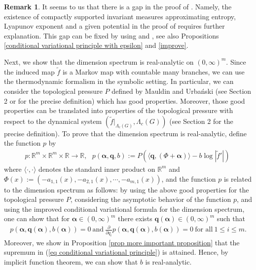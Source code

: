 \documentclass{article}
\theoremstyle{definition}
\newtheorem{rem}[thm]{Remark}
\begin{document}
\begin{rem} \label{remark-gap}
   It seems to us that there is a gap in the proof of \cite[Lemma 3.2]{iommi2015multifractal}. Namely, the existence of compactly supported invariant measures approximating  entropy, Lyapunov exponent and a given potential in the proof of \cite[Lemma 3.2]{iommi2015multifractal} requires further explanation. This gap can be fixed by  using \cite[Lemma 2.3]{jaerisch2021mixed} and \cite[Main theorem]{takahasi2020entropy}, see also Propositions \ref{conditional variational principle with epsilon} and \ref{improve}.  
\end{rem}
Next, we show that the dimension spectrum is real-analytic on $(0,\infty)^m$. Since the induced map $\tilde f$ is a Markov map with countable many branches, we can use the thermodynamic formalism in the symbolic setting. In particular, we can consider the topological pressure $P$ defined by Mauldin and Urba\'nski (see Section 2 or \cite{mauldin2003graph} for the precise definition) which has good properties. Moreover, those good properties can be translated into properties of the topological pressure with respect to the dynamical system $(\tilde f|_{\Lambda_c(G)},\Lambda_c(G))$ (see Section 2 for the precise definition).
To prove that the dimension spectrum is real-analytic, define the function $p$ by 
\begin{align*}
 p:\mathbb{R}^m\times\mathbb{R}^m\times\mathbb{R}\rightarrow \mathbb{R},\ \ \    
p(\boldsymbol{\alpha},\boldsymbol{q},b):=P(\langle\boldsymbol{q},(\Phi+\boldsymbol{\alpha})\rangle-b\log|\tilde f'|)\  
\end{align*} 
where $\langle\cdot ,\cdot \rangle$ denotes the standard inner product on $\mathbb{R}^m$ and $\Phi(x):=(-a_{1,1}(x),-a_{2,1}(x),\cdots,-a_{m,1}(x)) \nonumber$, and the function $p$ is related to the dimension spectrum as follows:
by using the above good properties for the topological pressure $P$, considering the asymptotic behavior of the function $p$, and using the improved conditional  variational formula for the dimension spectrum, 
 one can show that for $\boldsymbol{\alpha}\in(0,\infty)^m$ there exists $\boldsymbol{q}(\boldsymbol{\alpha})\in(0,\infty)^m$ such that 
\begin{align}\label{equation G}
    p(\boldsymbol{\alpha},\boldsymbol{q}(\boldsymbol{\alpha}),b(\boldsymbol{\alpha}))=0\ \text{and}\  \frac{\partial}{\partial q_i}p(\boldsymbol{\alpha},\boldsymbol{q}(\boldsymbol{\alpha}),b(\boldsymbol{\alpha}))=0\ \text{for all}\ 1\leq i \leq m.
\end{align}
Moreover, we show in Proposition \ref{prop more important proposition} that the supremum in (\ref{eq conditional variational principle}) is attained. Hence, by implicit function theorem, we can show that $b$ is real-analytic. \\
\end{document}
